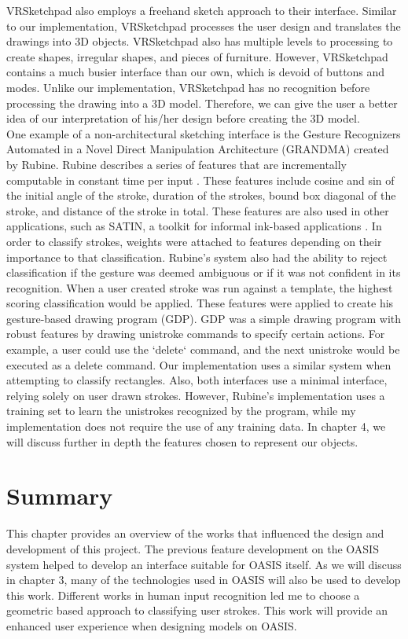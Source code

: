 VRSketchpad also employs a freehand sketch approach to their interface. Similar to our implementation, VRSketchpad processes the user design and translates the drawings into 3D objects. VRSketchpad also has multiple levels to processing to create shapes, irregular shapes, and pieces of furniture. However, VRSketchpad contains a much busier interface than our own, which is devoid of buttons and modes. Unlike our implementation, VRSketchpad has no recognition before processing the drawing into a 3D model. Therefore, we can give the user a better idea of our interpretation of his/her design before creating the 3D model.\\

One example of a non-architectural sketching interface is the Gesture Recognizers Automated in a Novel Direct Manipulation Architecture (GRANDMA) created by Rubine. Rubine describes a series of features that are incrementally computable in constant time per input \cite{rubinegestures}. These features include cosine and sin of the initial angle of the stroke, duration of the strokes, bound box diagonal of the stroke, and distance of the stroke in total. These features are also used in other applications, such as SATIN, a toolkit for informal ink-based applications \cite{satin}. In order to classify strokes, weights were attached to features depending on their importance to that classification. Rubine's system also had the ability to reject classification if the gesture was deemed ambiguous or if it was not confident in its recognition. When a user created stroke was run against a template, the highest scoring classification would be applied. These features were applied to create his gesture-based drawing program (GDP). GDP was a simple drawing program with robust features by drawing unistroke commands to specify certain actions. For example, a user could use the `delete` command, and the next unistroke would be executed as a delete command. Our implementation uses a similar system when attempting to classify rectangles. Also, both interfaces use a minimal interface, relying solely on user drawn strokes. However, Rubine's implementation uses a training set to learn the unistrokes recognized by the program, while my implementation does not require the use of any training data. In chapter 4, we will discuss further in depth the features chosen to represent our objects. \\

\section{Summary}
This chapter provides an overview of the works that influenced the design and development of this project. The previous feature development on the OASIS system helped to develop an interface suitable for OASIS itself. As we will discuss in chapter 3, many of the technologies used in OASIS will also be used to develop this work. Different works in human input recognition led me to choose a geometric based approach to classifying user strokes. This work will provide an enhanced user experience when designing models on OASIS.